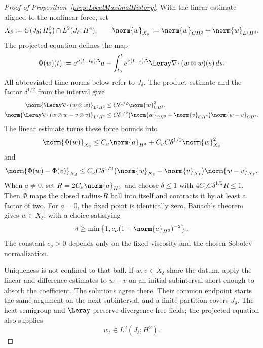 \begin{proof}[Proof of Proposition~\ref{prop:LocalMaximalHistory}]
With the linear estimate aligned to the nonlinear force, set
\[
  X_\delta
  :=C(J_\delta;H^3_\sigma)\cap L^2(J_\delta;H^4),
  \qquad
  \norm{w}_{X_\delta}
  :=\norm{w}_{C H^3}+\norm{w}_{L^2H^4}.
\]
The projected equation defines the map
\begin{equation}
  \Phi(w)(t)
  :=e^{\nu(t-t_0)\Delta}a
  -\int_{t_0}^{t}e^{\nu(t-s)\Delta}
    \Leray\nabla\!\cdot(w\otimes w)(s)\,ds.
  \label{eq:LocalMildMap}
\end{equation}
All abbreviated time norms below refer to \(J_\delta\).  The product estimate
and the factor \(\delta^{1/2}\) from the interval give
\begin{align}
  \norm{\Leray\nabla\!\cdot(w\otimes w)}_{L^2H^2}
  &\leq C\delta^{1/2}\norm{w}_{C H^3}^2,
  \label{eq:LocalQuadraticCount}
  \\
  \norm{\Leray\nabla\!\cdot(w\otimes w-v\otimes v)}_{L^2H^2}
  &\leq C\delta^{1/2}
  \bigl(\norm{w}_{C H^3}+\norm{v}_{C H^3}\bigr)
  \norm{w-v}_{C H^3}.
  \label{eq:LocalDifferenceCount}
\end{align}
The linear estimate turns these force bounds into
\[
  \norm{\Phi(w)}_{X_\delta}
  \leq C_\nu\norm{a}_{H^3}
  +C_\nu C\delta^{1/2}\norm{w}_{X_\delta}^2
\]
and
\[
  \norm{\Phi(w)-\Phi(v)}_{X_\delta}
  \leq C_\nu C\delta^{1/2}
  \bigl(\norm{w}_{X_\delta}+\norm{v}_{X_\delta}\bigr)
  \norm{w-v}_{X_\delta}.
\]
When \(a\neq0\), set \(R=2C_\nu\norm{a}_{H^3}\) and choose
\(\delta\leq1\) with \(4C_\nu C\delta^{1/2}R\leq1\).  Then \(\Phi\) maps the
closed radius-\(R\) ball into itself and contracts it by at least a factor of
two.  For \(a=0\), the fixed point is identically zero.  Banach’s theorem gives
\(w\in X_\delta\), with a choice satisfying
\begin{equation}
  \delta
  \geq
  \min\left\{1,c_\nu(1+\norm{a}_{H^3})^{-2}\right\}.
  \label{eq:LocalLifespan}
\end{equation}
The constant \(c_\nu>0\) depends only on the fixed viscosity and the chosen
Sobolev normalization.

Uniqueness is not confined to that ball.  If \(w,v\in X_\delta\) share the
datum, apply the linear and difference estimates to \(w-v\) on an initial
subinterval short enough to absorb the coefficient.  The solutions agree
there.  Their common endpoint starts the same argument on the next subinterval,
and a finite partition covers \(J_\delta\).  The heat semigroup and \(\Leray\)
preserve divergence-free fields; the projected equation also supplies
\begin{equation}
  w_t\in L^2(J_\delta;H^2).
  \label{eq:LocalTimeRow}
\end{equation}


\end{proof}
